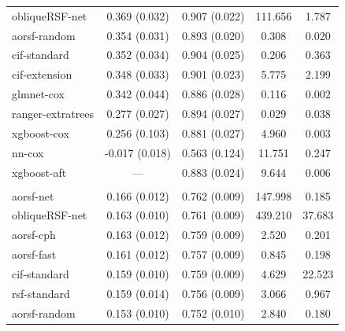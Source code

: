 \documentclass{article}\usepackage[]{graphicx}\usepackage[]{xcolor}
\newenvironment{knitrout}{}{} %
\begin{document}
\begin{knitrout}
\begin{longtable}[t]{lcccc}
\hspace{1em}obliqueRSF-net & 0.369 (0.032) & 0.907 (0.022) & 111.656 & 1.787\\
\hspace{1em}aorsf-random & 0.354 (0.031) & 0.893 (0.020) & 0.308 & 0.020\\
\hspace{1em}cif-standard & 0.352 (0.034) & 0.904 (0.025) & 0.206 & 0.363\\
\hspace{1em}cif-extension & 0.348 (0.033) & 0.901 (0.023) & 5.775 & 2.199\\
\hspace{1em}glmnet-cox & 0.342 (0.044) & 0.886 (0.028) & 0.116 & 0.002\\
\hspace{1em}ranger-extratrees & 0.277 (0.027) & 0.894 (0.027) & 0.029 & 0.038\\
\hspace{1em}xgboost-cox & 0.256 (0.103) & 0.881 (0.027) & 4.960 & 0.003\\
\hspace{1em}nn-cox & -0.017 (0.018) & 0.563 (0.124) & 11.751 & 0.247\\
\hspace{1em}xgboost-aft & --- & 0.883 (0.024) & 9.644 & 0.006\\
\addlinespace[0.3em]
\multicolumn{5}{l}{\textit{\textbf{Rotterdam tumor bank; death, n = 2982, p = 11}}}\\
\hline
\hspace{1em}aorsf-net & 0.166 (0.012) & 0.762 (0.009) & 147.998 & 0.185\\
\hspace{1em}obliqueRSF-net & 0.163 (0.010) & 0.761 (0.009) & 439.210 & 37.683\\
\hspace{1em}aorsf-cph & 0.163 (0.012) & 0.759 (0.009) & 2.520 & 0.201\\
\hspace{1em}aorsf-fast & 0.161 (0.012) & 0.757 (0.009) & 0.845 & 0.198\\
\hspace{1em}cif-standard & 0.159 (0.010) & 0.759 (0.009) & 4.629 & 22.523\\
\hspace{1em}rsf-standard & 0.159 (0.014) & 0.756 (0.009) & 3.066 & 0.967\\
\hspace{1em}aorsf-random & 0.153 (0.010) & 0.752 (0.010) & 2.840 & 0.180\\

\end{longtable}
\end{knitrout}
\end{document}
